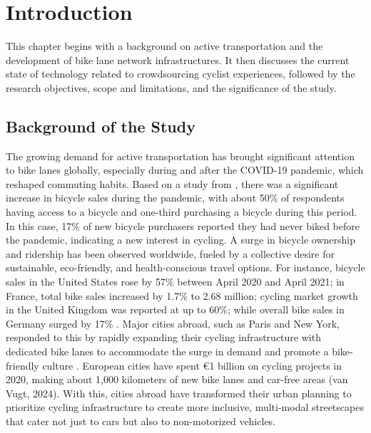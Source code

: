 %
%
%                 

\chapter{Introduction}
\label{sec:researchdesc}    %

This chapter begins with a background on active transportation and the development of bike lane network infrastructures. It then discusses the current state of technology related to crowdsourcing cyclist experiences, followed by the research objectives, scope and limitations, and the significance of the study.

\section{Background of the Study}
\label{sec:overview}

%
%
The growing demand for active transportation has brought significant attention to bike lanes globally, especially during and after the COVID-19 pandemic, which reshaped commuting habits. Based on a study from \citet{Younes:2023}, there was a significant increase in bicycle sales during the pandemic, with about 50\% of respondents having access to a bicycle and one-third purchasing a bicycle during this period. In this case, 17\% of new bicycle purchasers reported they had never biked before the pandemic, indicating a new interest in cycling. A surge in bicycle ownership and ridership has been observed worldwide, fueled by a collective desire for sustainable, eco-friendly, and health-conscious travel options. For instance, bicycle sales in the United States rose by 57\% between April 2020 and April 2021; in France, total bike sales increased by 1.7\% to 2.68 million; cycling market growth in the United Kingdom was reported at up to 60\%; while overall bike sales in Germany surged by 17\% \citep{Francke:2022}. Major cities abroad, such as Paris and New York, responded to this by rapidly expanding their cycling infrastructure with dedicated bike lanes to accommodate the surge in demand and promote a bike-friendly culture \citep{NYC_DOT:2023}. European cities have spent €1 billion on cycling projects in 2020, making about 1,000 kilometers of new bike lanes and car-free areas (van Vugt, 2024). With this, cities abroad have transformed their urban planning to prioritize cycling infrastructure to create more inclusive, multi-modal streetscapes that cater not just to cars but also to non-motorized vehicles.

